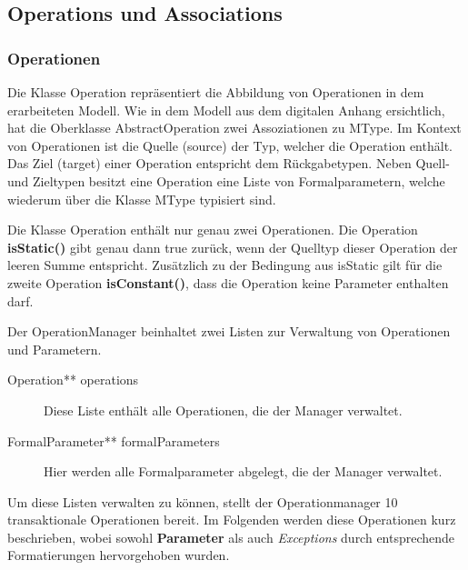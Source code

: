 \subsection{Operations und Associations}

\subsubsection{Operationen}

Die Klasse Operation repräsentiert die Abbildung von Operationen in dem erarbeiteten Modell.
Wie in dem Modell aus dem digitalen Anhang ersichtlich, hat die Oberklasse AbstractOperation zwei  Assoziationen zu MType. 
Im Kontext von Operationen ist die Quelle (source) der Typ, welcher die Operation enthält. 
Das Ziel (target) einer Operation entspricht dem Rückgabetypen.
Neben Quell- und Zieltypen besitzt eine Operation eine Liste von Formalparametern, welche 
wiederum über die Klasse MType typisiert sind.

Die Klasse Operation enthält nur genau zwei Operationen.
Die Operation \textbf{isStatic()} gibt genau dann true zurück, wenn der Quelltyp dieser Operation der leeren Summe entspricht.
Zusätzlich zu der Bedingung aus isStatic gilt für die zweite Operation \textbf{isConstant()}, dass die Operation keine Parameter enthalten darf. 



Der OperationManager beinhaltet zwei Listen zur Verwaltung von Operationen und Parametern.

\begin{description}
\item[Operation** operations] Diese Liste enthält alle Operationen, die der Manager verwaltet.
\item[FormalParameter** formalParameters] Hier werden alle Formalparameter abgelegt, die der Manager verwaltet.
\end{description}

Um diese Listen verwalten zu können, stellt der Operationmanager 10 transaktionale Operationen bereit.
Im Folgenden werden diese Operationen kurz beschrieben, wobei sowohl \textbf{Parameter} als auch \emph{Exceptions} durch entsprechende Formatierungen hervorgehoben wurden.

